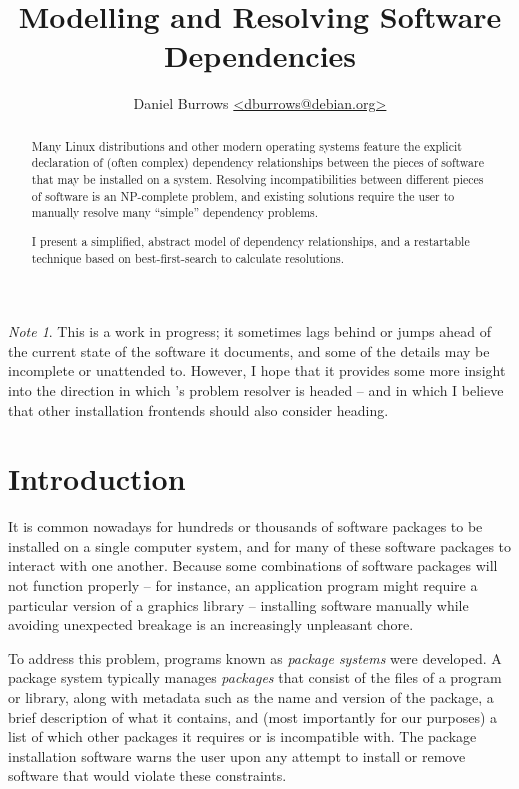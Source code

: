 \documentclass[letterpaper]{article}
\author{Daniel Burrows \url{<dburrows@debian.org>}}
\title{Modelling and Resolving Software Dependencies}
\theoremstyle{definition}
\theoremstyle{remark}
\newtheorem*{note}{Note}
\newcommand{\pkg}[1]{\text{\url{#1}}}
\begin{document}
\maketitle

\begin{abstract}
  Many Linux distributions and other modern operating systems feature
  the explicit declaration of (often complex) dependency relationships
  between the pieces of software that may be installed on a system.
  Resolving incompatibilities between different pieces of software is
  an NP-complete problem, and existing solutions require the user to
  manually resolve many ``simple'' dependency problems.

  I present a simplified, abstract model of dependency relationships,
  and a restartable technique based on best-first-search to calculate
  resolutions.
\end{abstract}

\begin{note}
  This is a work in progress; it sometimes lags behind or jumps ahead
  of the current state of the software it documents, and some of the
  details may be incomplete or unattended to.  However, I hope that it
  provides some more insight into the direction in which
  \pkg{aptitude}'s problem resolver is headed -- and in which I
  believe that other installation frontends should also consider
  heading.
\end{note}

\section{Introduction}

It is common nowadays for hundreds or thousands of software packages
to be installed on a single computer system, and for many of these
software packages to interact with one another.  Because some
combinations of software packages will not function properly -- for
instance, an application program might require a particular version of
a graphics library -- installing software manually while avoiding
unexpected breakage is an increasingly unpleasant chore.

To address this problem, programs known as \emph{package systems} were
developed.  A package system typically manages \emph{packages} that
consist of the files of a program or library, along with metadata such
as the name and version of the package, a brief description of what it
contains, and (most importantly for our purposes) a list of which
other packages it requires or is incompatible with.  The package
installation software warns the user upon any attempt to install or
remove software that would violate these constraints.
\end{document}
